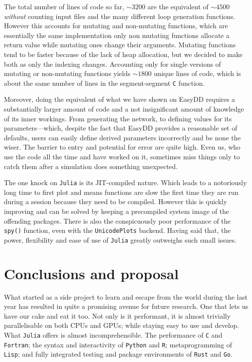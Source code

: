 The total number of lines of code so far, $\sim 3200$ are the equivalent of $\sim 4500$ \emph{without} counting input files and the many different loop generation functions. However this accounts for mutating and non-mutating functions, which are essentially the same implementation only non mutating functions allocate a return value while mutating ones change their arguments. Mutating functions tend to be faster because of the lack of heap allocation, but we decided to make both as only the indexing changes. Accounting only for single versions of mutating or non-mutating functions yields $\sim 1800$ unique lines of code, which is about the same number of lines in the segment-segment \texttt{C} function.

Moreover, doing the equivalent of what we have shown on EasyDD requires a substantially larger amount of code and a not insignificant amount of knowledge of its inner workings. From generating the network, to defining values for its parameters---which, despite the fact that EasyDD provides a reasonable set of defaults, users can easily define derived parameters incorrectly and be none the wiser. The barrier to entry and potential for error are quite high. Even us, who use the code all the time and have worked on it, sometimes miss things only to catch them after a simulation does something unexpected.

The one knock on \texttt{Julia} is its JIT-compiled nature. Which leads to a notoriously long time to first plot and means functions are slow the first time they are run during a session because they need to be compiled. However this is quickly improving and can be solved by keeping a precompiled system image of the offending packages. There is also the conspicuously poor performance of the \texttt{spy()} function, even with the \texttt{UnicodePlots} backend. Having said that, the power, flexibility and ease of use of \texttt{Julia} greatly outweighs such small issues.

\section{Conclusions and proposal}\label{s:concProp}

What started as a side project to learn and escape from the world during the last year has resulted in quite a promising avenue for future research. One that lets us have our cake and eat it too. Not only is it performant, it is almost trivially parallelisable on both CPUs and GPUs; while staying easy to use and develop. What \texttt{Julia} offers is almost incomprehensible. The performance of \texttt{C} and \texttt{Fortran}; the syntax and interactivity of \texttt{Python} and \texttt{R}; metaprogramming of \texttt{Lisp}; and fully integrated testing and package environments of \texttt{Rust} and \texttt{Go}.

